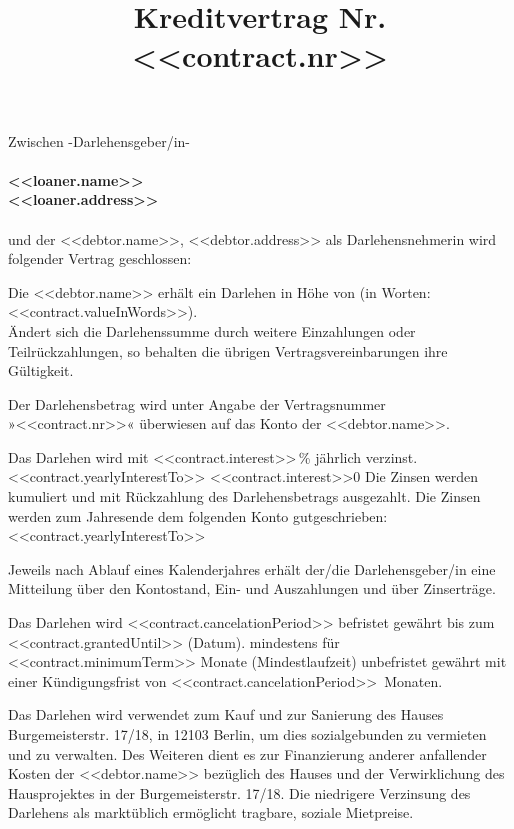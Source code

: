 \documentclass[]{scrartcl}
\title{\vspace{-10pt}Kreditvertrag Nr. <<contract.nr>>\vspace{-30pt}}
\date{}
\newcommand{\addressStreet}{Burgemeisterstr. 17/18}
\newcommand{\addressWithZIP}{\addressStreet, in 12103 Berlin}
\newcommand*{\yearlyInterestTo}{<<contract.yearlyInterestTo>>}
\newcommand*{\cancelationPeriod}{<<contract.cancelationPeriod>>}
\newcommand*{\interest}{<<contract.interest>>}
\newcommand*{\zeroInterest}{0}
\begin{document}
\maketitle \thispagestyle{fancy}

\noindent Zwischen -Darlehensgeber/in- \\ \\
 \textbf{<<loaner.name>>\\ <<loaner.address>>}  \\ \\
und der <<debtor.name>>, <<debtor.address>> als Darlehensnehmerin wird folgender Vertrag geschlossen:

\begin{contract}


Die <<debtor.name>> erhält ein Darlehen in Höhe von \textbf{} (in Worten: <<contract.valueInWords>>). \\
Ändert sich die Darlehenssumme durch weitere Einzahlungen oder Teilrückzahlungen, so behalten die
übrigen Vertragsvereinbarungen ihre Gültigkeit.

Der Darlehensbetrag wird unter Angabe der Vertragsnummer »<<contract.nr>>« überwiesen auf das Konto der <<debtor.name>>.

Das Darlehen wird  mit \interest\,\% jährlich verzinst. \\
\ifx\yearlyInterestTo\empty
  \ifx\interest\zeroInterest
  \else
  Die Zinsen werden kumuliert und mit Rückzahlung des Darlehensbetrags ausgezahlt.
  \fi
\else
Die Zinsen werden zum Jahresende dem folgenden Konto gutgeschrieben: \\ \yearlyInterestTo \\
\fi

Jeweils nach Ablauf eines Kalenderjahres erhält der/die Darlehensgeber/in eine Mitteilung über den
Kontostand, Ein- und Auszahlungen und über Zinserträge.

Das Darlehen wird
\ifx\cancelationPeriod\empty
 befristet gewährt bis zum <<contract.grantedUntil>> (Datum).
\else
 mindestens für <<contract.minimumTerm>> Monate (Mindestlaufzeit) unbefristet gewährt mit einer Kündigungsfrist von \cancelationPeriod\ Monaten.
\fi

Das Darlehen wird verwendet zum Kauf und zur Sanierung des Hauses \addressWithZIP, um dies sozialgebunden zu vermieten und zu verwalten. Des Weiteren dient es zur Finanzierung anderer anfallender Kosten der <<debtor.name>> bezüglich des Hauses und der Verwirklichung des Hausprojektes in der \addressStreet. Die niedrigere Verzinsung des Darlehens als marktüblich ermöglicht tragbare, soziale Mietpreise.


\end{contract}
\end{document}
